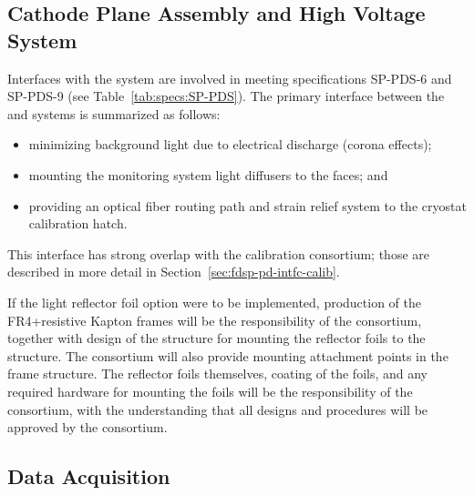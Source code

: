 \subsection{Cathode Plane Assembly and High Voltage System}
\label{sec:fdsp-pd-intfc-le}



Interfaces with the  system are involved in meeting specifications SP-PDS-6 and SP-PDS-9 (see Table~\ref{tab:specs:SP-PDS}).  The primary interface between the  and  systems is summarized as follows:
\begin{itemize}
    \item minimizing background light due to electrical discharge (corona effects);
    \item mounting the  monitoring system light diffusers to the  faces; and 
    \item providing an optical fiber routing path and strain relief system to the cryostat calibration hatch.
\end{itemize} 


This interface has strong overlap with the calibration consortium; those are described in more detail in Section~\ref{sec:fdsp-pd-intfc-calib}.



If the light reflector foil option were to be implemented, production of the FR4+resistive Kapton  frames will be the responsibility of the  consortium, together with design of the structure for mounting the  reflector foils to the  structure.  The  consortium will also provide mounting attachment points in the  frame structure.
 The reflector foils themselves,  coating of the  foils, and any required hardware for mounting the foils will be the responsibility of the  consortium, with the understanding that all designs and procedures will be approved by the  consortium. 



\subsection{Data Acquisition}
\label{sec:fdsp-pd-intfc-daq}


